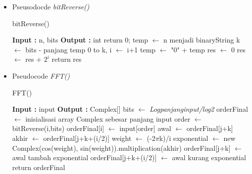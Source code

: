 \begin{itemize}
    \pagebreak
    \item Pseusodocde \textit{bitReverse()}
    
    \begin{algorithm}
        \caption{bitReverse()}
        \label{alg:bitReverse}
        \begin{algorithmic}[1]
            \State \textbf{Input :} n, bits
            \State \textbf{Output :} int 
                    \State return 0;
                \EndIf
                \State temp $\leftarrow$ n menjadi binaryString
                    \State k $\leftarrow$ bits - panjang temp
                     0 to k, i $\leftarrow$ i+1
                        temp $\leftarrow$ "0" + temp
                    \EndWhile
                \EndIf
                \State res $\leftarrow$ 0
                        res $\leftarrow$ res + $2^i$
                    \EndIf
                \EndFor
                \State return res
            \EndFunction
        \end{algorithmic}
    \end{algorithm}
    
    \item Pseudocode \textit{FFT()}
    
    \begin{breakablealgorithm}
        \caption{FFT()}
        \label{alg:fft}
        \begin{algorithmic}[1]
            \State \textbf{Input :} input
            \State \textbf{Output :} Complex[] 
                bits $\leftarrow$ \textit{Logpanjanginput/log2}
                orderFinal $\leftarrow$ inisialisasi array Complex sebesar panjang input
                    order $\leftarrow$ bitReverse(i,bits)
                    orderFinal[i] $\leftarrow$ input[order]
                \EndFor
                            \State awal $\leftarrow$ orderFinal[j+k]
                            \State akhir $\leftarrow$ orderFinal[j+k+(i/2)]
                            \State weight $\leftarrow$ (-2$\pi$k)/i
                            \State exponential $\leftarrow$ new Complex(cos(weight), sin(weight)).multiplication(akhir)
                            \State orderFinal[j+k] $\leftarrow$ awal tambah exponential
                            \State orderFinal[j+k+(i/2)] $\leftarrow$ awal kurang exponential
                        \EndFor
                    \EndFor
                \EndFor
                \State return orderFinal
            \EndFunction
        \end{algorithmic}
    \end{breakablealgorithm}
    
\end{itemize}
    
    
    
    


